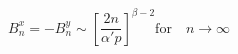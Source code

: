 \begin{equation}
B^x_n = -B^y_n \sim \left[ \frac{2n}{\alpha' p} \right]^{\beta - 2} 
\mathrm{for}\quad n \rightarrow \infty 
\end{equation}

